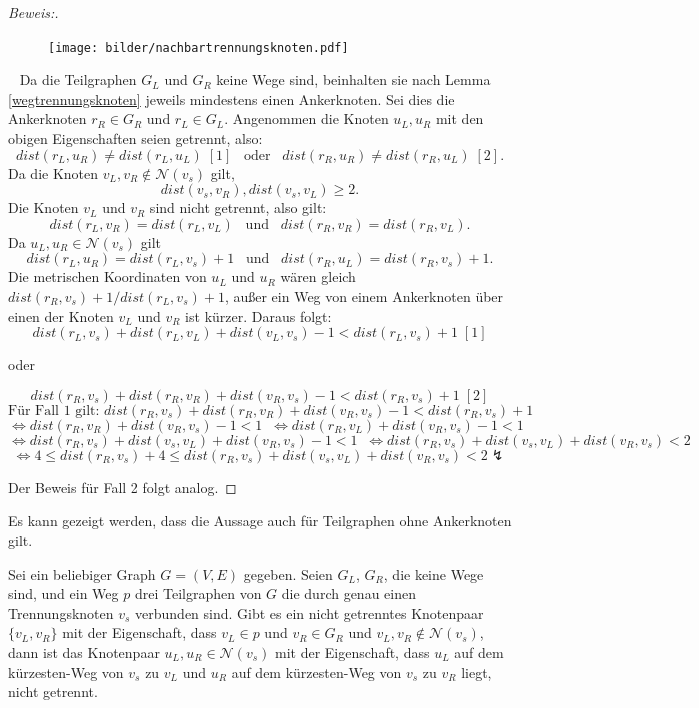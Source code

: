 \begin{proof}[Beweis:]~\newline
\begin{figure}[!h]
\centering
\texttt{[image: bilder/nachbartrennungsknoten.pdf]}
\end{figure}
~\linebreak
Da die Teilgraphen $G_L$ und $G_R$ keine Wege sind, beinhalten sie nach Lemma \ref{wegtrennungsknoten} jeweils mindestens einen Ankerknoten. Sei dies die Ankerknoten $r_R \in G_R$ und $r_L \in G_L$. Angenommen die Knoten $u_L,u_R$ mit den obigen Eigenschaften seien getrennt, also: $$dist(r_L,u_R)\neq dist(r_L,u_L)\; [1]\;\;\; \text{oder}\;\;\; dist(r_R,u_R)\neq dist(r_R,u_L)\; [2].$$
  Da die Knoten $v_L, v_R \notin \mathcal{N}(v_s)$ gilt, $$dist(v_s,v_R),dist(v_s,v_L)\geq 2.$$ Die Knoten $v_L$ und $v_R$ sind nicht getrennt, also gilt: $$dist(r_L,v_R)=dist(r_L,v_L)\;\;\; \text{und}\;\;\; dist(r_R,v_R)=dist(r_R,v_L).$$ Da $u_L,u_R \in \mathcal{N}(v_s)$ gilt $$dist(r_L,u_R)=dist(r_L,v_s)+1\;\;\; \text{und}\;\;\;dist(r_R,u_L)=dist(r_R,v_s)+1.$$   
Die metrischen Koordinaten von $u_L$ und $u_R$ wären gleich $dist(r_R,v_s)+1/dist(r_L,v_s)+1$, außer ein Weg von einem Ankerknoten über einen der Knoten $v_L$ und $v_R$ ist kürzer. Daraus folgt: $$dist(r_L,v_s)+dist(r_L,v_L)+dist(v_L,v_s)-1< dist(r_L,v_s)+1\;[1]$$ \begin{center} oder  \end{center}$$dist(r_R,v_s)+dist(r_R,v_R)+dist(v_R,v_s)-1< dist(r_R,v_s)+1\;[2]$$ \vspace{+2mm}
  $$\text{Für Fall 1 gilt: } dist(r_R,v_s)+dist(r_R,v_R)+dist(v_R,v_s)-1< dist(r_R,v_s)+1$$
  $$\Leftrightarrow dist(r_R,v_R)+dist(v_R,v_s)-1< 1 \;\;\Leftrightarrow dist(r_R,v_L)+dist(v_R,v_s)-1< 1$$
  $$\Leftrightarrow dist(r_R,v_s)+ dist(v_s,v_L)+dist(v_R,v_s)-1 < 1 \;\;\Leftrightarrow dist(r_R,v_s)+dist(v_s,v_L)+dist(v_R,v_s)< 2$$
  $$\Leftrightarrow  4 \leq dist(r_R,v_s) +4 \leq dist(r_R,v_s)+dist(v_s,v_L)+dist(v_R,v_s)< 2 \lightning$$

Der Beweis für Fall 2 folgt analog. 
  \end{proof}
Es kann gezeigt werden, dass die Aussage auch für Teilgraphen ohne Ankerknoten gilt.
\begin{lem}
\label{nachbartrennungsknoten2}
Sei ein beliebiger Graph $G=(V,E)$ gegeben. Seien $G_L$, $G_R$, die keine Wege sind, und ein Weg $p$ drei Teilgraphen von $G$ die durch genau einen Trennungsknoten $v_s$ verbunden sind. Gibt es ein nicht getrenntes Knotenpaar $\{v_L,v_R\}$ mit der Eigenschaft, dass $v_L\in p$ und $v_R \in G_R$ und $v_L, v_R \notin \mathcal{N}(v_s)$, dann ist das Knotenpaar $u_L,u_R \in \mathcal{N}(v_s)$ mit der Eigenschaft, dass $u_L$ auf dem kürzesten-Weg von $v_s$ zu $v_L$ und $u_R$ auf dem kürzesten-Weg von $v_s$ zu $v_R$ liegt, nicht getrennt.
\end{lem}
